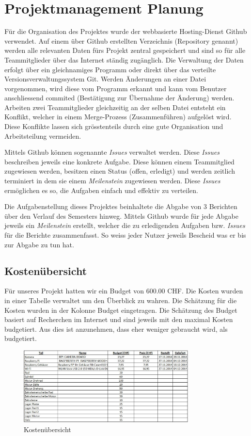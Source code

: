 \section{Projektmanagement Planung}
Für die Organisation des Projektes wurde der webbasierte Hosting-Dienst
Github verwendet. Auf einem über Github erstellten Verzeichnis (Repository
genannt) werden alle relevanten Daten fürs Projekt zentral gespeichert und
sind so für alle Teammitglieder über das Internet ständig zugänglich. Die
Verwaltung der Daten erfolgt über ein gleichnamiges Programm oder direkt
über das verteilte Versionsverwaltungssystem Git. Werden Änderungen an
einer Datei vorgenommen, wird diese vom Programm erkannt und kann vom
Benutzer anschliessend commited (Bestätigung zur Übernahme der Änderung)
werden. Arbeiten zwei Teammitglieder gleichzeitig an der selben Datei
entsteht ein Konflikt, welcher in einem Merge-Prozess (Zusammenführen)
aufgelöst wird. Diese Konflikte lassen sich grösstenteils durch eine gute
Organisation und Arbeitsteilung vermeiden.

Mittels Github können sogenannte \emph{Issues} verwaltet werden. Diese
\emph{Issues} beschreiben jeweils eine konkrete Aufgabe. Diese können
einem Teammitglied zugewiesen werden, besitzen einen Status (offen,
erledigt) und werden zeitlich terminiert in dem sie einem
\emph{Meilenstein} zugewiesen werden. Diese \emph{Issues} ermöglichen
es so, die Aufgaben einfach und effektiv zu verteilen.

Die Aufgabenstellung dieses Projektes beinhaltete die Abgabe von 3
Berichten über den Verlauf des Semesters hinweg. Mittels Github wurde
für jede Abgabe jeweils ein \emph{Meilenstein} erstellt, welcher die
zu erledigenden Aufgaben bzw. \emph{Issues} für die Berichte
zusammenfasst. So weiss jeder Nutzer jeweils Bescheid was er bis zur
Abgabe zu tun hat.

\subsection{Kostenübersicht}
Für unseres Projekt hatten wir ein Budget von 600.00 CHF. Die Kosten
wurden in einer Tabelle verwaltet um den Überblick zu wahren. Die
Schätzung für die Kosten wurden in der Kolonne Budget eingetragen. Die
Schätzung des Budget basiert auf Recherchen im Internet und sind jeweils
mit den maximal Kosten budgetiert. Aus dies ist anzunehmen, dass eher
weniger gebraucht wird, als budgetiert.

\begin{figure}[h!]
	\center
	\includegraphics[width=0.8\textwidth]{../../fig/Kostenuebersicht.jpg}
	\caption{Kostenübersicht}
	\label{fig:Kostenuebersicht}
\end{figure}

